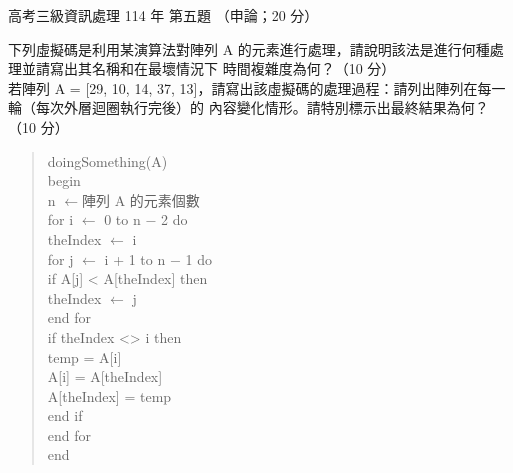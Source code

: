 \begin{pastexam}[label={px:gk3-114-ds-05}]{高考三級資訊處理 114 年 第五題}
（申論；20 分）

下列虛擬碼是利用某演算法對陣列 A 的元素進行處理，請說明該法是進行何種處理並請寫出其名稱和在最壞情況下
時間複雜度為何？（10 分）\\
若陣列 A = [29, 10, 14, 37, 13]，請寫出該虛擬碼的處理過程：請列出陣列在每一輪（每次外層迴圈執行完後）的
內容變化情形。請特別標示出最終結果為何？（10 分）

\begin{quote}
doingSomething(A)\\
begin\\
\hspace*{1.5em}n $\leftarrow$陣列 A 的元素個數\\
\hspace*{1.5em}for i $\leftarrow$ 0 to n $-$ 2 do\\
\hspace*{3em}theIndex $\leftarrow$ i\\
\hspace*{3em}for j $\leftarrow$ i + 1 to n $-$ 1 do\\
\hspace*{4.5em}if A[j] < A[theIndex] then\\
\hspace*{6em}theIndex $\leftarrow$ j\\
\hspace*{3em}end for\\
\hspace*{5em}if theIndex <> i then\\
\hspace*{7em}temp = A[i]\\
\hspace*{6.5em}A[i] = A[theIndex]\\
\hspace*{6.5em}A[theIndex] = temp\\
\hspace*{4.5em}end if\\
\hspace*{3em}end for\\
end
\end{quote}
\end{pastexam}

